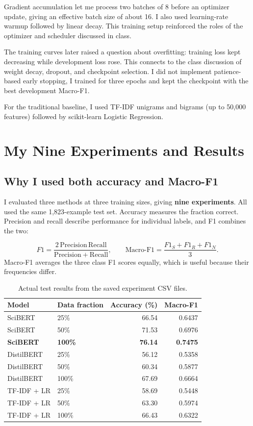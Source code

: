 \documentclass[11pt,letterpaper]{article}
\begin{document}
Gradient accumulation let me process two batches of 8 before an optimizer update, giving an effective batch size of about 16. I also used learning-rate warmup followed by linear decay. This training setup reinforced the roles of the optimizer and scheduler discussed in class.

The training curves later raised a question about overfitting: training loss kept decreasing while development loss rose. This connects to the class discussion of weight decay, dropout, and checkpoint selection. I did not implement patience-based early stopping, I trained for three epochs and kept the checkpoint with the best development Macro-F1.

For the traditional baseline, I used TF-IDF unigrams and bigrams (up to 50,000 features) followed by scikit-learn Logistic Regression.

\section{My Nine Experiments and Results}
\subsection{Why I used both accuracy and Macro-F1}
I evaluated three methods at three training sizes, giving \textbf{nine experiments}. All used the same 1,823-example test set. Accuracy measures the fraction correct. Precision and recall describe performance for individual labels, and F1 combines the two:

\[
F1=\frac{2\,\mathrm{Precision}\,\mathrm{Recall}}{\mathrm{Precision}+\mathrm{Recall}},
\qquad \mathrm{Macro\text{-}F1}=\frac{F1_S+F1_R+F1_N}{3}.
\]
Macro-F1 averages the three class F1 scores equally, which is useful because their frequencies differ.

\begin{table}[H]
\centering\small
\caption{Actual test results from the saved experiment CSV files.}
\begin{tabular}{@{}llrr@{}}\toprule
\textbf{Model} & \textbf{Data fraction} & \textbf{Accuracy (\%)} & \textbf{Macro-F1}\\\midrule
SciBERT & 25\% & 66.54 & 0.6437\\
SciBERT & 50\% & 71.53 & 0.6976\\
\textbf{SciBERT} & \textbf{100\%} & \textbf{76.14} & \textbf{0.7475}\\
DistilBERT & 25\% & 56.12 & 0.5358\\
DistilBERT & 50\% & 60.34 & 0.5877\\
DistilBERT & 100\% & 67.69 & 0.6664\\
TF-IDF + LR & 25\% & 58.69 & 0.5448\\
TF-IDF + LR & 50\% & 63.30 & 0.5974\\
TF-IDF + LR & 100\% & 66.43 & 0.6322\\\bottomrule
\end{tabular}
\end{table}
\end{document}
